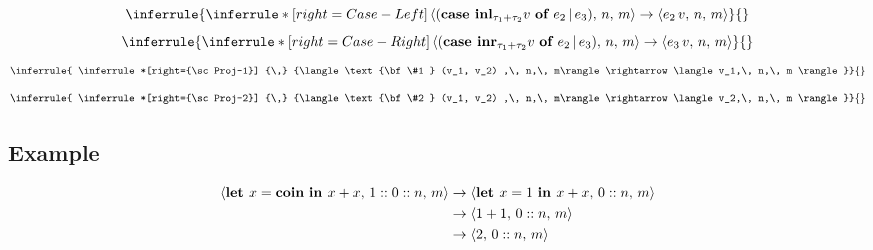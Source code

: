\documentclass{article}
\begin{document}
\begin{multicols}{2}
				\begin{equation*}
				\inferrule{
				\inferrule*[right={\sc Case-Left}]
				{\,}
				{\langle (\text{\bf case } {\bf inl}_{\tau_1 + \tau_2} v \text{ \bf of } e_2 \,|\, e_3) ,\, n,\, m\rangle \rightarrow \langle e_2\, v,\, n,\, m \rangle}}
				{}
			\end{equation*}
				\begin{equation*}
				\inferrule{
				\inferrule*[right={\sc Case-Right}]
				{\,}
				{\langle (\text{\bf case } {\bf inr}_{\tau_1 + \tau_2} v \text{ \bf of } e_2 \,|\, e_3) ,\, n,\, m\rangle \rightarrow \langle e_3\, v,\, n,\, m \rangle}}
				{}
			\end{equation*}
				\begin{equation*}
				\inferrule{
				\inferrule*[right={\sc Proj-1}]
				{\,}
				{\langle \text{\bf \#1 } (v_1, v_2) ,\, n,\, m\rangle \rightarrow \langle v_1,\, n,\, m \rangle}}
				{}
			\end{equation*}
				\begin{equation*}
				\inferrule{
				\inferrule*[right={\sc Proj-2}]
				{\,}
				{\langle \text{\bf \#2 } (v_1, v_2) ,\, n,\, m\rangle \rightarrow \langle v_2,\, n,\, m \rangle}}
				{}
			\end{equation*}
		\end{multicols}

	\subsection{Example}
			\begin{equation*}
				\begin{split}
					\langle \text{\bf let } x = {\bf coin} \text{ \bf in } x + x,\, 1::0::n,\, m\rangle
					&\rightarrow \langle \text{\bf let } x = 1 \text{ \bf in } x + x,\, 0::n,\, m\rangle \\
					&\rightarrow \langle 1 + 1,\, 0::n,\, m\rangle \\
					&\rightarrow \langle 2,\, 0::n,\, m\rangle \\
				\end{split}
			\end{equation*}
\end{document}
